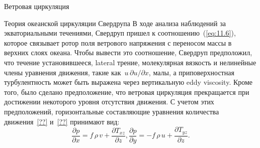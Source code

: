 \begin{chapter}{Ветровая циркуляция}
\begin{section}{Теория океанской циркуляции Свердрупа}\label{sec:SverdrupTheory}
%
В ходе анализа наблюдений за экваториальными
течениями, Свердруп пришел к соотношению~(\ref{eq:11.6}), которое связывает
ротор поля ветрового напряжения с переносом
массы в верхних слоях океана. Чтобы вывести это
соотношение, Свердруп предположил, что течение установившееся, 
lateral трение, молекулярная вязкость
и нелинейные члены уравнения движения, такие
как~$u\, \partial{u} / \partial{x}$, малы, 
а приповерхностная турбулентность 
может быть выражена через вертикальную eddy viscosity. 
Кроме того, было сделано предположение, что ветровая циркуляция 
прекращается при достижении некоторого уровня отсутствия движения.
С учетом этих предположений, горизонтальные составляющие уравнения
количества движения~\ref{??} и~\ref{??} принимают вид:
\begin{subequations}\label{eq:11.1}
\begin{equation}
 \frac{\partial{p}}{\partial{x}} 
    =  f\,\rho\,v + \frac{\partial{T_{xz}}}{\partial{z}},
\end{equation}
\begin{equation}
  \frac{\partial{p}}{\partial{y}} 
    = -f\,\rho\,u + \frac{\partial{T_{yz}}}{\partial{z}}.
\end{equation}
\end{subequations}
%


\end{section}
\end{chapter}

